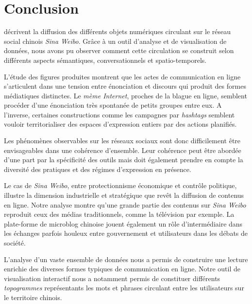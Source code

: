 \chapter*{Conclusion}

 décrivent la diffusion des différents objets numériques circulant sur le réseau social chinois \textit{Sina Weibo}. 
Grâce à un outil d'analyse et de visualisation de données, nous avons pu observer comment cette circulation se construit selon différents aspects sémantiques, conversationnels et spatio-temporels.

L'étude des figures produites montrent que les actes de communication en ligne s'articulent dans une tension entre énonciation et discours qui produit des formes médiatiques distinctes. Le \textit{mème Internet}, proches de la blague en ligne, semblent procéder d'une énonciation très spontanée de petits groupes entre eux. A l'inverse, certaines constructions comme les campagnes par \textit{hashtags} semblent vouloir territorialiser des espaces d'expression entiers par des actions planifiés.

Les phénomènes observables sur les réseaux sociaux sont donc difficilement être envisageables dans une cohérence d'ensemble. Leur cohérence peut être abordée d'une part par la spécificité des outils mais doit également prendre en compte la diversité des pratiques et des régimes d'expression en présence.

Le cas de \textit{Sina Weibo}, entre protectionnisme économique et contrôle politique, illustre la dimension industrielle et stratégique que revêt la diffusion de contenus en ligne. Notre analyse montre qu'une grande partie des contenus sur \textit{Sina Weibo} reproduit ceux des médias traditionnels, comme la télévision par exemple. La plate-forme de microblog chinoise jouent également un rôle d'intermédiaire dans les échanges parfois houleux entre gouvernement et utilisateurs dans les débats de société.

L'analyse d'un vaste ensemble de données nous a permis de construire une lecture enrichie des diverses formes typiques de communication en ligne. 
Notre outil de visualisation interactif nous a notamment permis de constituer différents \textit{topogrammes} représentants les mots et phrases circulant entre les utilisateurs sur le territoire chinois. 

